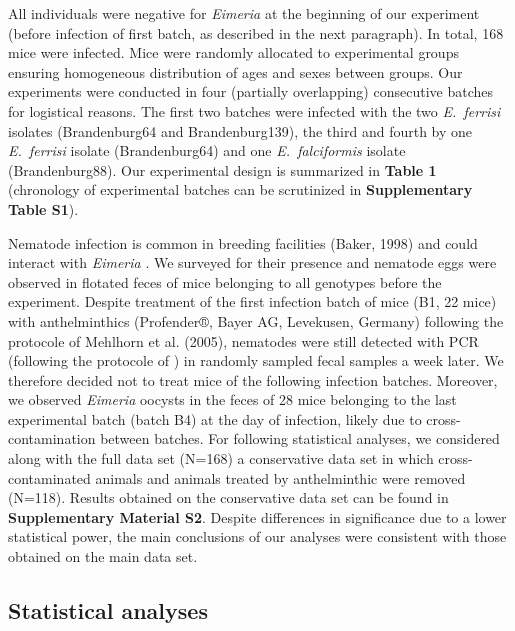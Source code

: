 \documentclass[12pt]{article}
\begin{document}
All individuals were negative for \textit{Eimeria }at the beginning of our experiment (before infection of first batch, as described in the next paragraph). In total, 168 mice were infected. Mice were randomly allocated to experimental groups ensuring homogeneous distribution of ages and sexes between groups. Our experiments were conducted in four (partially overlapping) consecutive batches for logistical reasons. The first two batches were infected with the two \textit{E.~ferrisi }isolates (Brandenburg64 and Brandenburg139), the third and fourth by one \textit{E.~ferrisi }isolate (Brandenburg64) and one \textit{E.~falciformis }isolate (Brandenburg88). Our experimental design is summarized in \textbf{Table 1} (chronology of experimental batches can be scrutinized in \textbf{Supplementary Table S1}). \par

Nematode infection is common in breeding facilities (Baker, 1998) and could interact with \textit{Eimeria} \citep{clerc_parasitic_2019}. We surveyed for their presence and nematode eggs were observed in flotated feces of mice belonging to all genotypes before the experiment. Despite treatment of the first infection batch of mice (B1, 22 mice) with anthelminthics (Profender®, Bayer AG, Levekusen, Germany) following the protocole of Mehlhorn et al. (2005), nematodes were still detected with PCR (following the protocole of \cite{floyd_nematode-specific_2005}) in randomly sampled fecal samples a week later. We therefore decided not to treat mice of the following infection batches. Moreover, we observed \textit{Eimeria }oocysts in the feces of 28 mice belonging to the last experimental batch (batch B4) at the day of infection, likely due to cross-contamination between batches. For following statistical analyses, we considered along with the full data set (N=168) a conservative data set in which cross-contaminated animals and animals treated by anthelminthic were removed (N=118). Results obtained on the conservative data set can be found in \textbf{Supplementary Material S2}. Despite differences in significance due to a lower statistical power, the main conclusions of our analyses were consistent with those obtained on the main data set.\par

\subsection{Statistical analyses}
\end{document}
